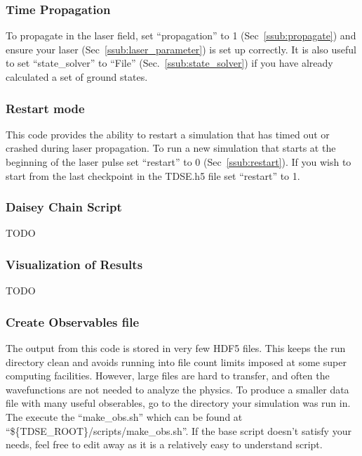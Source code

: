 \documentclass{article}
\begin{document}
\subsubsection{Time Propagation} %
\label{ssub:time_propagation}
To propagate in the laser field, set ``propagation'' to 1 (Sec~\ref{ssub:propagate}) and ensure your laser (Sec~\ref{ssub:laser_parameter}) is set up correctly. It is also useful to set ``state\_solver'' to ``File'' (Sec.~\ref{ssub:state_solver}) if you have already calculated a set of ground states.

\subsubsection{Restart mode} %
\label{ssub:restart_mode}
This code provides the ability to restart a simulation that has timed out or crashed during laser propagation. To run a new simulation that starts at the beginning of the laser pulse set ``restart'' to 0 (Sec~\ref{ssub:restart}). If you wish to start from the last checkpoint in the TDSE.h5 file set ``restart'' to 1.

\subsubsection{Daisey Chain Script} %
\label{ssub:daisey_chain_script}
TODO

\subsubsection{Visualization of Results} %
\label{ssub:visualization_of_results}
TODO

\subsubsection{Create Observables file} %
\label{ssub:create_observables_file}
The output from this code is stored in very few HDF5 files. This keeps the run directory clean and avoids running into file count limits imposed at some super computing facilities. However, large files are hard to transfer, and often the wavefunctions are not needed to analyze the physics. To produce a smaller data file with many useful obserables, go to the directory your simulation was run in. The execute the ``make\_obs.sh'' which can be found at ``\$\{TDSE\_ROOT\}/scripts/make\_obs.sh''. If the base script doesn't satisfy your needs, feel free to edit away as it is a relatively easy to understand script.
\end{document}
